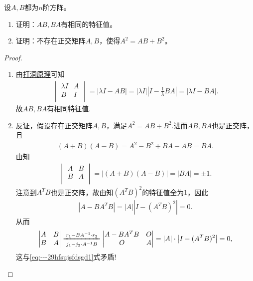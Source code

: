 \documentclass[../../main.tex]{subfiles}%
\begin{document}
\begin{example}
设$A,B$都为$n$阶方阵。
\begin{enumerate}[(1)]
\item 证明：$AB,BA$有相同的特征值。
\item 证明：不存在正交矩阵$A,B$，使得$A^2 = AB + B^2$。
\end{enumerate}
\end{example}
\begin{proof}
\begin{enumerate}[(1)]
\item 由\hyperref[proposition:打洞原理]{打洞原理}可知
\begin{align*}
\begin{vmatrix}
\lambda I& A\\
B& I\\
\end{vmatrix}
=|\lambda I - AB|=|\lambda I|\left|I - \frac{1}{\lambda}BA\right|=|\lambda I - BA|.
\end{align*}
故$AB,BA$有相同特征值.

\item 反证，假设存在正交矩阵$A,B$，满足$A^2=AB+B^2$.进而$AB,BA$也是正交阵，且
\begin{align*}
(A+B)(A-B)=A^2-B^2+BA-AB=BA.
\end{align*}
由知
\begin{align}
\begin{vmatrix}
A& B\\
B& A\\
\end{vmatrix}
=|(A+B)(A-B)|=|BA|=\pm 1.\label{eq:---29hfsujsfdsgd1}
\end{align}
注意到$A^TB$也是正交阵，故由知$(A^TB)^2$的特征值全为$1$，因此
\begin{align*}
|A - BA^TB|=|A|\left|I - (A^TB)^2\right|=0.
\end{align*}
从而
\begin{align*}
\begin{vmatrix}
A& B\\
B& A\\
\end{vmatrix}
\xlongequal[j_1-j_2\cdot A^{-1}B]{r_1-BA^{-1}\cdot r_2}
\begin{vmatrix}
A-BA^TB& O\\
O& A\\
\end{vmatrix}
=|A|\cdot \left|I - (A^TB)^2\right|=0,
\end{align*}
这与\eqref{eq:---29hfsujsfdsgd1}式矛盾!

\end{enumerate}

\end{proof}
\end{document}
